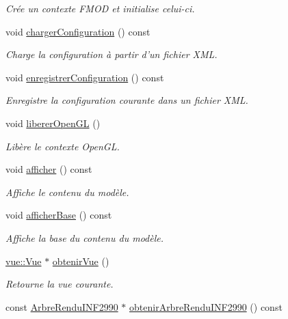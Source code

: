 \begin{DoxyCompactItemize}
\begin{DoxyCompactList}\small\item\em Crée un contexte F\-M\-O\-D et initialise celui-\/ci. \end{DoxyCompactList}\item 
void \hyperlink{group__inf2990_ga4967547e0683bfdca700118df1c18bca}{charger\-Configuration} () const 
\begin{DoxyCompactList}\small\item\em Charge la configuration à partir d'un fichier X\-M\-L. \end{DoxyCompactList}\item 
void \hyperlink{group__inf2990_ga277d8d9cea21e20fb366a0d48525f2c9}{enregistrer\-Configuration} () const 
\begin{DoxyCompactList}\small\item\em Enregistre la configuration courante dans un fichier X\-M\-L. \end{DoxyCompactList}\item 
void \hyperlink{group__inf2990_gac7b831ce13626514e9637c4533d7c15d}{liberer\-Open\-G\-L} ()
\begin{DoxyCompactList}\small\item\em Libère le contexte Open\-G\-L. \end{DoxyCompactList}\item 
void \hyperlink{group__inf2990_gac884e818dab5fe049a37b3f6f1c5d8c6}{afficher} () const 
\begin{DoxyCompactList}\small\item\em Affiche le contenu du modèle. \end{DoxyCompactList}\item 
void \hyperlink{group__inf2990_ga23bed5e3b226e446cfee30084150f7f7}{afficher\-Base} () const 
\begin{DoxyCompactList}\small\item\em Affiche la base du contenu du modèle. \end{DoxyCompactList}\item 
\hyperlink{classvue_1_1_vue}{vue\-::\-Vue} $\ast$ \hyperlink{group__inf2990_gaa56cf96b7e381e0f14e2c9a55be913bf}{obtenir\-Vue} ()
\begin{DoxyCompactList}\small\item\em Retourne la vue courante. \end{DoxyCompactList}\item 
const \hyperlink{class_arbre_rendu_i_n_f2990}{Arbre\-Rendu\-I\-N\-F2990} $\ast$ \hyperlink{group__inf2990_gaf578161d03b2157cdaa3182900ff61cc}{obtenir\-Arbre\-Rendu\-I\-N\-F2990} () const 

\end{DoxyCompactItemize}
